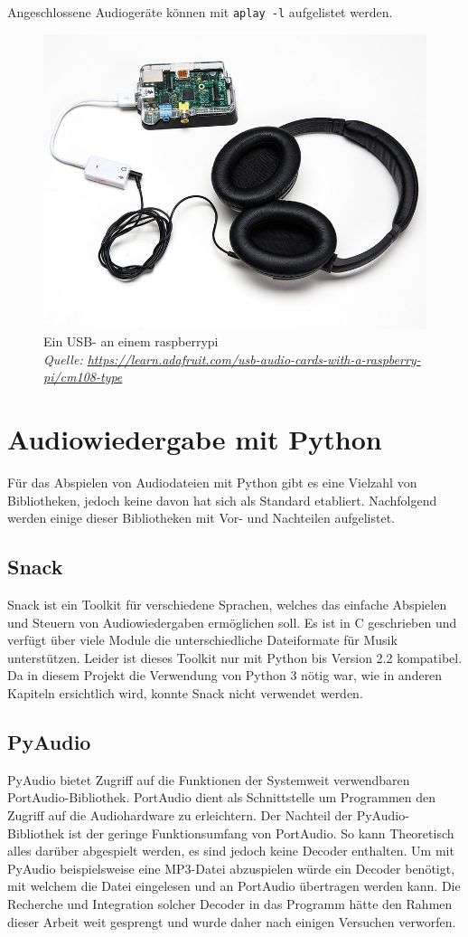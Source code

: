 \documentclass[12pt,a4paper,hidelinks]{scrreprt}
\begin{document}
	Angeschlossene Audiogeräte können mit \texttt{aplay -l} aufgelistet werden.
	
	\begin{figure}
	\centering
	\includegraphics[width=0.5\linewidth]{./img/Adafruit_USB_DAC.jpg}
	\caption{Ein USB- an einem \gls{raspberrypi} \\
	\tiny\textit{Quelle: \url{https://learn.adafruit.com/usb-audio-cards-with-a-raspberry-pi/cm108-type}}}
	\label{fig:adafruitusbdac}
	\end{figure}
	
\section{Audiowiedergabe mit Python}\label{sec:audiopython}
	Für das Abspielen von Audiodateien mit Python gibt es eine Vielzahl von Bibliotheken, jedoch keine davon hat sich als Standard etabliert. Nachfolgend werden einige dieser Bibliotheken mit Vor- und Nachteilen aufgelistet.
	
\subsection{Snack}
	Snack ist ein Toolkit für verschiedene Sprachen, welches das einfache Abspielen und Steuern von Audiowiedergaben ermöglichen soll. Es ist in C geschrieben und verfügt über viele Module die unterschiedliche Dateiformate für Musik unterstützen. \cite{snack}
	Leider ist dieses Toolkit nur mit Python bis Version 2.2 kompatibel. Da in diesem Projekt die Verwendung von Python 3 nötig war, wie in anderen Kapiteln ersichtlich wird, konnte Snack nicht verwendet werden.
	
\subsection{PyAudio}
	PyAudio bietet Zugriff auf die Funktionen der Systemweit verwendbaren PortAudio-Bibliothek. 
	PortAudio dient als Schnittstelle um Programmen den Zugriff auf die Audiohardware zu erleichtern. Der Nachteil der PyAudio-Bibliothek ist der geringe Funktionsumfang von PortAudio. So kann Theoretisch alles darüber abgespielt werden, es sind jedoch keine Decoder enthalten. Um mit PyAudio beispielsweise eine MP3-Datei abzuspielen würde ein Decoder benötigt, mit welchem die Datei eingelesen und an PortAudio übertragen werden kann. Die Recherche und Integration solcher Decoder in das Programm hätte den Rahmen dieser Arbeit weit gesprengt und wurde daher nach einigen Versuchen verworfen. \cite{pyaudio}
	
\end{document}
